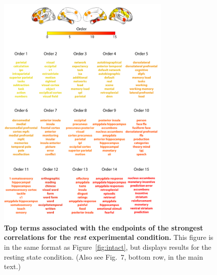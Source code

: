 \documentclass{article}
\newcommand{\neurosynth}{7}
\begin{document}
\begin{figure}[p!]
\centering
\includegraphics[width=0.75\textwidth]{figs/supp_15_rest}
\caption{\textbf{Top terms associated with the endpoints of the
    strongest correlations for the \textit{rest} experimental
    condition.}  This figure is in the same format as
  Figure~\ref{fig:intact}, but displays results for the
  resting state condition.  (Also see Fig.~\neurosynth,
bottom row, in the main text.)}
\label{fig:rest}
\end{figure}






\newpage
\renewcommand{\refname}{Supplemental references}

\end{document}
